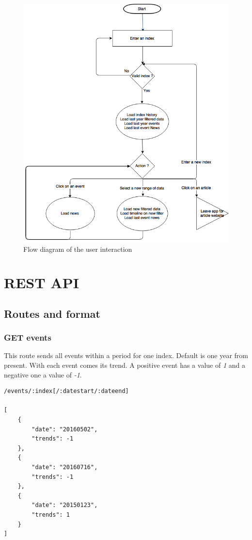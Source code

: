 \begin{figure}[H]
    \centering
    \includegraphics[scale=0.5]{Figures/st-workflow-app.png}
    \caption{Flow diagram of the user interaction}
    \label{fig:specs:flowdiagram}
\end{figure}

\section{REST API}

\subsection{Routes and format}

\subsubsection*{GET events}
This route sends all events within a period for one index. Default is one year from present. With each event comes its trend. A positive event has a value of \textit{1} and a negative one a value of \textit{-1}.
\begin{verbatim}
/events/:index[/:datestart/:dateend]

[
    {
        "date": "20160502",
        "trends": -1
    },
    {
        "date": "20160716",
        "trends": -1
    },
    {
        "date": "20150123",
        "trends": 1
    }
]
\end{verbatim}

